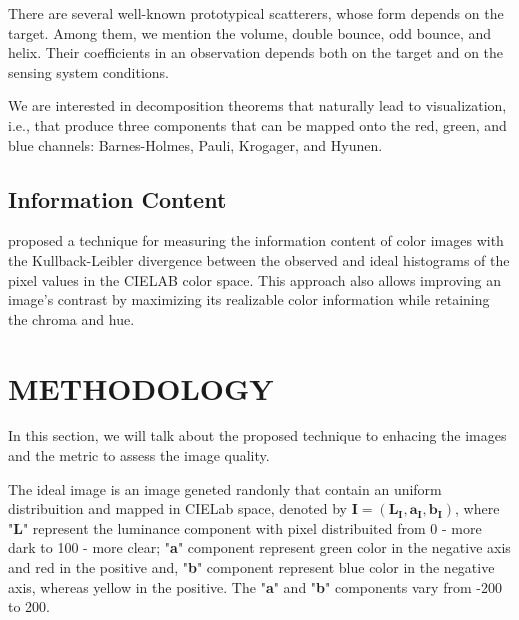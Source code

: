 \documentclass{article}
\begin{document}
There are several well-known prototypical scatterers, whose form depends on the target.
Among them, we mention the volume, double bounce, odd bounce, and helix.
Their coefficients in an observation depends both on the target and on the sensing system conditions.

We are interested in decomposition theorems that naturally lead to visualization, i.e., that produce three components that can be mapped onto the red, green, and blue channels: Barnes-Holmes, Pauli, Krogager, and Hyunen.

\subsection{Information Content}

\citet{AssessingInformationContentinColorImages} proposed a technique for measuring the information content of color images with the Kullback-Leibler divergence between the observed and ideal histograms of the pixel values in the CIELAB color space.
This approach also allows improving an image's contrast by maximizing its realizable color information while retaining the chroma and hue.


\section{METHODOLOGY}
\label{sec:meth}

In this section, we will talk about the proposed technique to enhacing the images and the metric to assess the image quality.

The ideal image is an image geneted randonly that contain an uniform distribuition and mapped in CIELab space, denoted by $\bm{ I= (L_I,a_I,b_I)}$, where "\textbf{L}" represent the luminance component with pixel distribuited from 0 - more dark to 100 - more clear; "\textbf{a}" component represent green color in the negative axis and red in the positive and, "\textbf{b}" component represent blue color in the negative axis, whereas yellow in the positive. The "\textbf{a}" and "\textbf{b}" components vary from -200 to 200.
\end{document}
